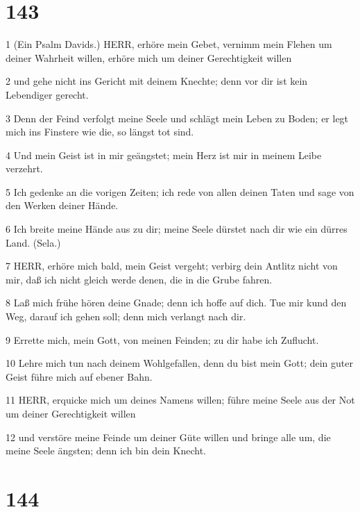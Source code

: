 \chapter{143}

\par 1 (Ein Psalm Davids.) HERR, erhöre mein Gebet, vernimm mein Flehen um deiner Wahrheit willen, erhöre mich um deiner Gerechtigkeit willen
\par 2 und gehe nicht ins Gericht mit deinem Knechte; denn vor dir ist kein Lebendiger gerecht.
\par 3 Denn der Feind verfolgt meine Seele und schlägt mein Leben zu Boden; er legt mich ins Finstere wie die, so längst tot sind.
\par 4 Und mein Geist ist in mir geängstet; mein Herz ist mir in meinem Leibe verzehrt.
\par 5 Ich gedenke an die vorigen Zeiten; ich rede von allen deinen Taten und sage von den Werken deiner Hände.
\par 6 Ich breite meine Hände aus zu dir; meine Seele dürstet nach dir wie ein dürres Land. (Sela.)
\par 7 HERR, erhöre mich bald, mein Geist vergeht; verbirg dein Antlitz nicht von mir, daß ich nicht gleich werde denen, die in die Grube fahren.
\par 8 Laß mich frühe hören deine Gnade; denn ich hoffe auf dich. Tue mir kund den Weg, darauf ich gehen soll; denn mich verlangt nach dir.
\par 9 Errette mich, mein Gott, von meinen Feinden; zu dir habe ich Zuflucht.
\par 10 Lehre mich tun nach deinem Wohlgefallen, denn du bist mein Gott; dein guter Geist führe mich auf ebener Bahn.
\par 11 HERR, erquicke mich um deines Namens willen; führe meine Seele aus der Not um deiner Gerechtigkeit willen
\par 12 und verstöre meine Feinde um deiner Güte willen und bringe alle um, die meine Seele ängsten; denn ich bin dein Knecht.

\chapter{144}

